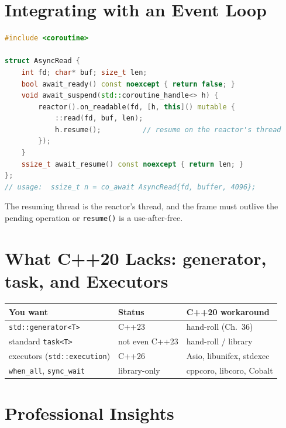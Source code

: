 \section{Integrating with an Event Loop}
\label{sec:c20-event-loop}

\begin{lstlisting}[language=C++,caption={An awaiter that parks the coroutine on an external completion}]
#include <coroutine>

struct AsyncRead {
    int fd; char* buf; size_t len;
    bool await_ready() const noexcept { return false; }
    void await_suspend(std::coroutine_handle<> h) {
        reactor().on_readable(fd, [h, this]() mutable {
            ::read(fd, buf, len);
            h.resume();          // resume on the reactor's thread
        });
    }
    ssize_t await_resume() const noexcept { return len; }
};
// usage:  ssize_t n = co_await AsyncRead{fd, buffer, 4096};
\end{lstlisting}

The resuming thread is the reactor's thread, and the frame must outlive the pending operation or \texttt{resume()} is a use-after-free.

\section{What C++20 Lacks: generator, task, and Executors}
\label{sec:c20-coro-lacks}

\begin{center}
\begin{tabular}{lll}
\hline
\textbf{You want} & \textbf{Status} & \textbf{C++20 workaround} \\
\hline
\texttt{std::generator<T>} & C++23 & hand-roll (Ch.\ 36) \\
standard \texttt{task<T>} & not even C++23 & hand-roll / library \\
executors (\texttt{std::execution}) & C++26 & Asio, libunifex, stdexec \\
\texttt{when\_all}, \texttt{sync\_wait} & library-only & cppcoro, libcoro, Cobalt \\
\hline
\end{tabular}
\end{center}

\section{Professional Insights}
\label{sec:c20-coroutines-ii-insights}

